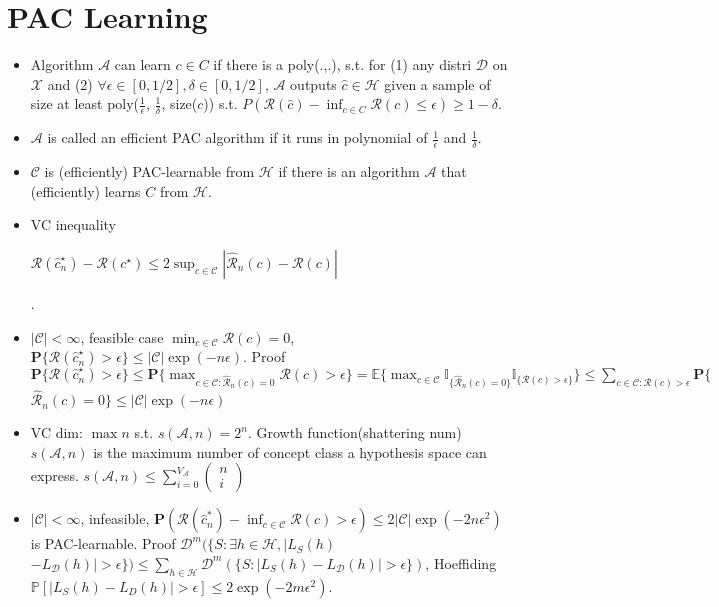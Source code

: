 \section{PAC Learning}

\begin{itemize}[itemsep=0pt,topsep=0pt, leftmargin=2pt, itemindent=5pt, labelwidth=5pt]
    \item Algorithm $\mathcal{A}$ can learn $c\in C$ if there is a poly(.,.), s.t. for (1) any distri $\mathcal{D}$ on $\mathcal{X}$ and (2) $\forall \epsilon\in [0, 1/2],\delta\in [0, 1/2]$, $\mathcal{A}$ outputs $\hat{c}\in \mathcal{H}$ given a sample of size at least poly($\frac{1}{\epsilon}$, $\frac{1}{\delta}$, size($c$)) s.t. $P(\mathcal{R}(\hat{c})-\inf_{c\in C}\mathcal{R}(c)\le\epsilon) \ge 1-\delta$.
    \item $\mathcal{A}$ is called an efficient PAC algorithm if it runs in polynomial of $\frac{1}{\epsilon}$ and $\frac{1}{\delta}$.
    \item $\mathcal{C}$ is (efficiently) PAC-learnable from $\mathcal{H}$ if there is an algorithm $\mathcal{A}$ that (efficiently) learns $C$ from $\mathcal{H}$.
    \item VC inequality\begin{scriptsize}$\mathcal{R}(\hat{c}_{n}^{\star})-\mathcal{R}(c^{\star}) \leq 2 \sup _{c \in \mathcal{C}}|\hat{\mathcal{R}}_{n}(c)-\mathcal{R}(c)|$\end{scriptsize}.
    \item $|\mathcal{C}|<\infty$, feasible case $\min _{c \in \mathcal{C}} \mathcal{R}(c)=0$, $\mathbf{P}\{\mathcal{R}(\hat{c}_{n}^{\star})>\epsilon\} \leq|\mathcal{C}| \exp (-n \epsilon)$. 
        Proof $\mathbf{P}\{\mathcal{R}(\hat{c}_{n}^{\star})>\epsilon\} \leq \mathbf{P}\{\max _{c \in \mathcal{C}: \hat{\mathcal{R}}_{n}(c)=0} \mathcal{R}(c)>\epsilon\} = \mathbb{E}\{\max _{c \in \mathcal{C}} \mathbb{I}_{\{\hat{\mathcal{R}}_{n}(c)=0\}} \mathbb{I}_{\{\mathcal{R}(c)>\epsilon\}}\}\leq \sum_{c \in \mathcal{C}: \mathcal{R}(c)>\epsilon} \mathbf{P}\{$\\$\hat{\mathcal{R}}_{n}(c)=0\} \leq|\mathcal{C}| \exp (-n \epsilon)$

    \item VC dim: $\max n$ s.t. $s(\mathcal{A}, n)=2^{n}$. Growth function(shattering num) $s(\mathcal{A}, n)$ is the maximum number of concept class a hypothesis space can express. $s(\mathcal{A}, n) \leq \sum_{i=0}^{V_{\mathcal{A}}}(\begin{array}{l}n \\i\end{array})$
    \item $|\mathcal{C}|<\infty$, infeasible, $\mathbf{P}(\mathcal{R}(\hat{c}_{n}^{*})-\inf _{c \in \mathcal{C}} \mathcal{R}(c)>\epsilon) \leq 2|\mathcal{C}| \exp (-2{n \epsilon^{2}})$  is PAC-learnable.
          Proof $\mathcal{D}^{m}(\{S: \exists h \in \mathcal{H},|L_{S}(h)$ $-L_{\mathcal{D}}(h)|>\epsilon\})\leq \sum_{h \in \mathcal{H}} \mathcal{D}^{m}(\{S:|L_{S}(h)-L_{\mathcal{D}}(h)|>\epsilon\})$, Hoeffiding $\mathbb{P}[|L_{S}(h)-L_{D}(h)|>\epsilon] \leq 2 \exp (-2 m \epsilon^{2})$.
\end{itemize}

